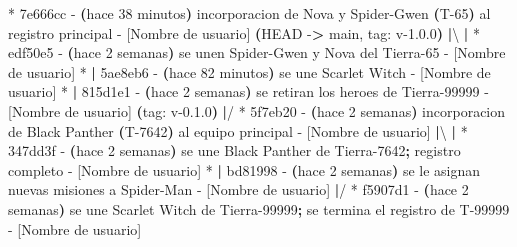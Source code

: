 \documentclass[
]{book}
\newenvironment{Shaded}{\begin{snugshade}}{\end{snugshade}}
\newcommand{\AttributeTok}[1]{\textcolor[rgb]{0.13,0.29,0.53}{#1}}
\newcommand{\ErrorTok}[1]{\textcolor[rgb]{0.64,0.00,0.00}{\textbf{#1}}}
\newcommand{\ExtensionTok}[1]{#1}
\newcommand{\KeywordTok}[1]{\textcolor[rgb]{0.13,0.29,0.53}{\textbf{#1}}}
\newcommand{\NormalTok}[1]{#1}
\newcommand{\OperatorTok}[1]{\textcolor[rgb]{0.81,0.36,0.00}{\textbf{#1}}}
\begin{document}
\begin{Shaded}
\begin{Highlighting}[]
\ExtensionTok{*}\NormalTok{   7e666cc }\AttributeTok{{-}} \ErrorTok{(}\ExtensionTok{hace}\NormalTok{ 38 minutos}\KeywordTok{)} \ExtensionTok{incorporacion}\NormalTok{ de Nova y Spider{-}Gwen }\ErrorTok{(}\ExtensionTok{T{-}65}\KeywordTok{)} \ExtensionTok{al}\NormalTok{ registro principal }\AttributeTok{{-}}\NormalTok{ [Nombre de usuario] }\ErrorTok{(}\ExtensionTok{HEAD} \AttributeTok{{-}}\OperatorTok{\textgreater{}}\NormalTok{ main, tag: v{-}1.0.0}\KeywordTok{)}
\KeywordTok{|}\ExtensionTok{\textbackslash{} } 
\KeywordTok{|} \ExtensionTok{*}\NormalTok{ edf50e5 }\AttributeTok{{-}} \ErrorTok{(}\ExtensionTok{hace}\NormalTok{ 2 semanas}\KeywordTok{)} \ExtensionTok{se}\NormalTok{ unen Spider{-}Gwen y Nova del Tierra{-}65 }\AttributeTok{{-}}\NormalTok{ [Nombre de usuario]}
\ExtensionTok{*} \KeywordTok{|} \ExtensionTok{5ae8eb6} \AttributeTok{{-}} \ErrorTok{(}\ExtensionTok{hace}\NormalTok{ 82 minutos}\KeywordTok{)} \ExtensionTok{se}\NormalTok{ une Scarlet Witch }\AttributeTok{{-}}\NormalTok{ [Nombre de usuario]}
\ExtensionTok{*} \KeywordTok{|} \ExtensionTok{815d1e1} \AttributeTok{{-}} \ErrorTok{(}\ExtensionTok{hace}\NormalTok{ 2 semanas}\KeywordTok{)} \ExtensionTok{se}\NormalTok{ retiran los heroes de Tierra{-}99999 }\AttributeTok{{-}}\NormalTok{ [Nombre de usuario] }\ErrorTok{(}\ExtensionTok{tag:}\NormalTok{ v{-}0.1.0}\KeywordTok{)}
\KeywordTok{|}\ExtensionTok{/}  
\ExtensionTok{*}\NormalTok{   5f7eb20 }\AttributeTok{{-}} \ErrorTok{(}\ExtensionTok{hace}\NormalTok{ 2 semanas}\KeywordTok{)} \ExtensionTok{incorporacion}\NormalTok{ de Black Panther }\ErrorTok{(}\ExtensionTok{T{-}7642}\KeywordTok{)} \ExtensionTok{al}\NormalTok{ equipo principal }\AttributeTok{{-}}\NormalTok{ [Nombre de usuario]}
\KeywordTok{|}\ExtensionTok{\textbackslash{} } 
\KeywordTok{|} \ExtensionTok{*}\NormalTok{ 347dd3f }\AttributeTok{{-}} \ErrorTok{(}\ExtensionTok{hace}\NormalTok{ 2 semanas}\KeywordTok{)} \ExtensionTok{se}\NormalTok{ une Black Panther de Tierra{-}7642}\KeywordTok{;} \ExtensionTok{registro}\NormalTok{ completo }\AttributeTok{{-}}\NormalTok{ [Nombre de usuario]}
\ExtensionTok{*} \KeywordTok{|} \ExtensionTok{bd81998} \AttributeTok{{-}} \ErrorTok{(}\ExtensionTok{hace}\NormalTok{ 2 semanas}\KeywordTok{)} \ExtensionTok{se}\NormalTok{ le asignan nuevas misiones a Spider{-}Man }\AttributeTok{{-}}\NormalTok{ [Nombre de usuario]}
\KeywordTok{|}\ExtensionTok{/}  
\ExtensionTok{*}\NormalTok{ f5907d1 }\AttributeTok{{-}} \ErrorTok{(}\ExtensionTok{hace}\NormalTok{ 2 semanas}\KeywordTok{)} \ExtensionTok{se}\NormalTok{ une Scarlet Witch de Tierra{-}99999}\KeywordTok{;} \ExtensionTok{se}\NormalTok{ termina el registro de T{-}99999 }\AttributeTok{{-}}\NormalTok{ [Nombre de usuario]}

\end{Highlighting}
\end{Shaded}
\end{document}
